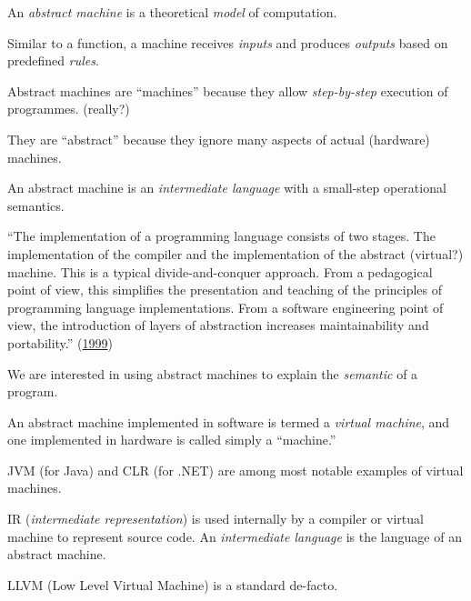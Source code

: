 \documentclass{article}
\begin{document}

\pptToc



An \emph{abstract machine} is a theoretical \emph{model} of computation.

Similar to a function, a machine receives \emph{inputs} and produces \emph{outputs} based on predefined \emph{rules}.

Abstract machines are ``machines'' because they allow \emph{step-by-step} execution of programmes. (really?)

They are ``abstract'' because they ignore many aspects of actual (hardware) machines.

An abstract machine is an \emph{intermediate language} with a small-step operational semantics.

\plush{}


``The implementation of a programming language consists of two
stages. The implementation of the compiler and the implementation of the abstract (virtual?) machine.
This is a typical divide-and-conquer approach.
From a pedagogical point of view, this simplifies the presentation and
teaching of the principles of programming language implementations.
From a software engineering point of view, the introduction of layers of
abstraction increases maintainability and portability.'' (\href{https://www.sciencedirect.com/science/article/abs/pii/S0167739X99000886}{1999})

We are interested in using abstract machines to explain the \emph{semantic} of a program.

\plush{}


An abstract machine implemented in software is termed a \emph{virtual machine},
and one implemented in hardware is called simply a ``machine.''

JVM (for Java) and CLR (for .NET) are among most notable examples of virtual machines.

IR (\emph{intermediate representation}) is used internally by a compiler or virtual machine to represent source code.
An \emph{intermediate language} is the language of an abstract machine.

\plush{}


LLVM (Low Level Virtual Machine) is a standard de-facto.
\end{document}
